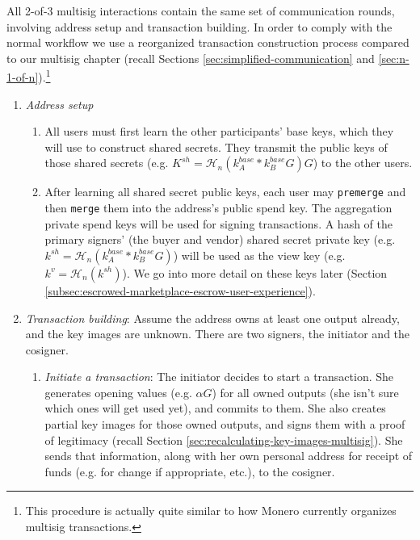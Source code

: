 All 2-of-3 multisig interactions contain the same set of communication rounds, involving address setup and transaction building. In order to comply with the normal workflow we use a reorganized transaction construction process compared to our multisig chapter (recall Sections \ref{sec:simplified-communication} and \ref{sec:n-1-of-n}).\footnote{This procedure is actually quite similar to how Monero currently organizes multisig transactions.}
\begin{enumerate}
    \item {\em Address setup}
    \begin{enumerate}
        \item All users must first learn the other participants' base keys, which they will use to construct shared secrets. They transmit the public keys of those shared secrets (e.g. $K^{sh} = \mathcal{H}_n(k^{base}_A*k^{base}_B G) G$) to the other users.
        \item After learning all shared secret public keys, each user may {\tt premerge} and then {\tt merge} them into the address's public spend key. The aggregation private spend keys will be used for signing transactions. A hash of the primary signers' (the buyer and vendor) shared secret private key (e.g. $k^{sh} = \mathcal{H}_n(k^{base}_A*k^{base}_B G)$) will be used as the view key (e.g. $k^v = \mathcal{H}_n(k^{sh})$). We go into more detail on these keys later (Section \ref{subsec:escrowed-marketplace-escrow-user-experience}).
    \end{enumerate}{}
    \item {\em Transaction building}: Assume the address owns at least one output already, and the key images are unknown. There are two signers, the initiator and the cosigner.
    \begin{enumerate}
        \item {\em Initiate a transaction}: The initiator decides to start a transaction. She generates opening values (e.g. $\alpha G$) for all owned outputs (she isn't sure which ones will get used yet), and commits to them. She also creates partial key images for those owned outputs, and signs them with a proof of legitimacy (recall Section \ref{sec:recalculating-key-images-multisig}). She sends that information, along with her own personal address for receipt of funds (e.g. for change if appropriate, etc.), to the cosigner.

\end{enumerate}
\end{enumerate}
